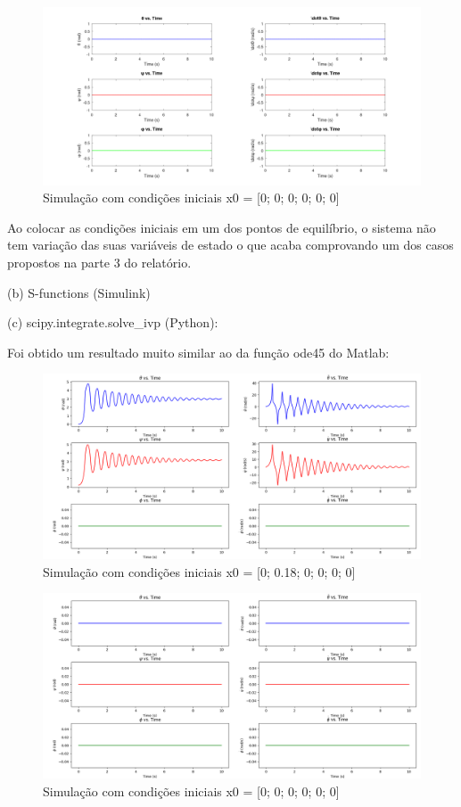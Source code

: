 \documentclass[10pt]{article}
\begin{document}
\begin{figure}[h]
    \centering
    \includegraphics[scale=0.229]{ode45_2.png}
    \caption{Simulação com condições iniciais x0 = [0; 0; 0; 0; 0; 0]}
\end{figure}

\quad Ao colocar as condições iniciais em um dos pontos de equilíbrio, o sistema não tem variação das suas variáveis de estado
o que acaba comprovando um dos casos propostos na parte 3 do relatório.

\newpage

\quad (b) S-functions (Simulink)

\quad (c) scipy.integrate.solve\_ivp (Python):

\quad Foi obtido um resultado muito similar ao da função ode45 do Matlab:

\begin{figure}[h]
    \centering
    \includegraphics[scale=0.4]{solve_ivp_1.png}
    \caption{Simulação com condições iniciais x0 = [0; 0.18; 0; 0; 0; 0]}
\end{figure}

\begin{figure}[h]
    \centering
    \includegraphics[scale=0.4]{solve_ivp_2.png}
    \caption{Simulação com condições iniciais x0 = [0; 0; 0; 0; 0; 0]}
\end{figure}
\end{document}
